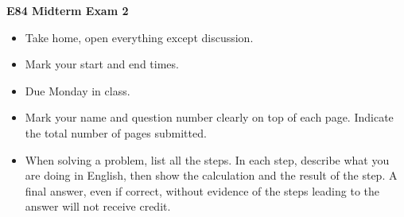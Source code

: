 
\usepackage{html}

\begin{center}
{\Large \bf E84 Midterm Exam 2}
\end{center}

\begin{itemize}
\item Take home, open everything except discussion.
\item Mark your start and end times. %
\item Due Monday in class.
\item Mark your name and question number clearly on top of each page.
	Indicate the total number of pages submitted.
\item When solving a problem, list all the steps. In each step, describe 
	what you are doing in English, then show the calculation and the 
	result of the step. A final answer, even if correct, without 
	evidence of the steps leading to the answer will not receive credit.
\end{itemize}

